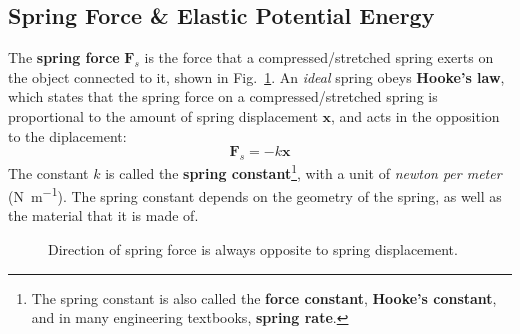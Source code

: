 \documentclass[11pt]{article}
\begin{document}
\subsection{Spring Force \& Elastic Potential Energy}
The \textbf{spring force} $\mathbf F_s$ is the force that a
compressed/stretched spring exerts on the object connected to it, shown in
Fig.~\ref{hooke1}. An \emph{ideal} spring obeys \textbf{Hooke's law}, which
states that the spring force on a compressed/stretched spring is proportional
to the amount of spring displacement $\mathbf x$, and acts in the opposition
to the diplacement:
\begin{equation}
  \boxed{
    \mathbf F_s=-k\mathbf x
  }
\end{equation}
The constant $k$ is called the \textbf{spring constant}\footnote{The spring
constant is also called the \textbf{force constant}, \textbf{Hooke's constant},
and in many engineering textbooks, \textbf{spring rate}.}, with a unit of
\emph{newton per meter} (\si{\newton\per\metre}). The spring constant depends
on the geometry of the spring, as well as the material that it is made of.
\begin{figure}[ht]
  \centering
  \hspace{.2in}
  \caption{Direction of spring force is always opposite to spring
    displacement.}
  \label{hooke1}
\end{figure}
\end{document}
